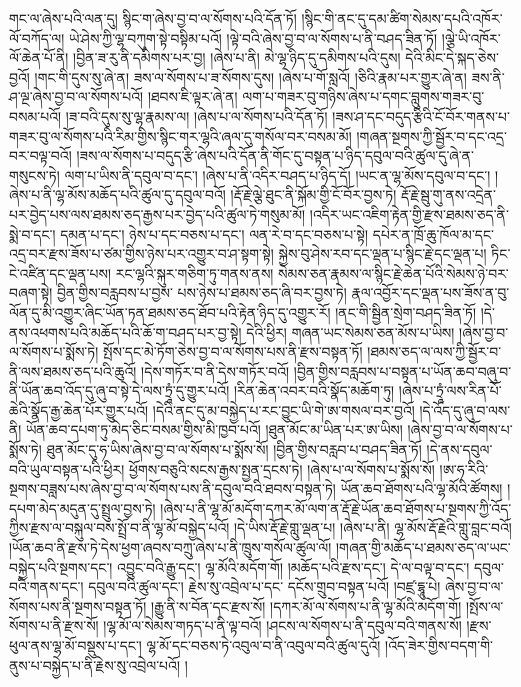 གང་ལ་ཞེས་པའི་ལན་དུ། སྙིང་ག་ཞེས་བྱ་བ་ལ་སོགས་པའི་དོན་ཏོ། །སྙིང་གི་ནང་དུ་དམ་ཚིག་སེམས་དཔའི་འཁོར་ལོ་བཀོད་ལ། ཡེ་ཤེས་ཀྱི་ལྷ་བཀུག་སྟེ་བསྟིམ་པའོ། །ལྟེ་བའི་ཞེས་བྱ་བ་ལ་སོགས་པ་ནི་བཤད་ཟིན་ཏོ། །ལྕེ་ཡི་འཁོར་ལོ་ཆེན་པོ་ནི། །བྱིན་ཟ་རུ་ནི་དམིགས་པར་བྱ། །ཞེས་པ་ནི། མེ་ལྷ་ཉིད་དུ་དམིགས་པའི་དུས། དེའི་མིང་དེ་སྐད་ཅེས་བྱའོ། །གང་གི་དུས་སུ་ཞེ་ན། ཟས་ལ་སོགས་པ་ཟ་སོགས་དུས། །ཞེས་པ་གོ་སླའོ། །ཅིའི་རྣམ་པར་གྱུར་ཞེ་ན། ཟས་ནི་ཤ་ལྔ་ཞེས་བྱ་བ་ལ་སོགས་པའོ། །ཐབས་ཇི་ལྟར་ཞེ་ན། ལག་པ་གཟར་བུ་གཉིས་ཞེས་པ་དགང་བླུགས་གཟར་བུ་བསམ་པའོ། །ཟ་བའི་དུས་སུ་ལྷ་རྣམས་ལ། །ཞེས་པ་ལ་སོགས་པའི་དོན་ཏོ། །ཟས་ཤ་དང་བདུད་རྩིའི་ངོ་བོར་གནས་པ་གཟར་བུ་ལ་སོགས་པའི་རིམ་གྱིས་སྙིང་གར་ལྷའི་ཞལ་དུ་གསོལ་བར་བསམ་མོ། །གཞན་སྔགས་ཀྱི་སྦྱོར་བ་དང་འདྲ་བར་བལྟ་བའོ། །ཟས་ལ་སོགས་པ་བདུད་རྩི་ཞེས་པའི་དོན་ནི་གོང་དུ་བསྟན་པ་ཉིད་དབུལ་བའི་ཚུལ་དུ་ཞེ་ན་གསུངས་ཏེ། ལག་པ་ཡིས་ནི་དབུལ་བ་དང་། །ཞེས་པ་ནི་འདིར་བཤད་པ་ཉིད་དོ། །ཡང་ན་ལྷ་མོས་དབུལ་བ་དང་། །ཞེས་པ་ནི་ལྷ་མོས་མཆོད་པའི་ཚུལ་དུ་དབུལ་བའོ། །རྡོ་རྗེ་ལྕེ་ཐུང་ནི་སྐོམ་གྱི་ངོ་བོར་བྱས་ཏེ། རྡོ་རྗེ་སྦུ་གུ་ནས་འདྲེན་པར་བྱེད་པས་ལས་ཐམས་ཅད་རྒྱས་པར་བྱེད་པའི་ཚུལ་ཏེ་གསུམ་མོ། །འདིར་ཡང་འཇིག་རྟེན་གྱི་རྫས་ཐམས་ཅད་ནི་སྨེ་བ་དང་། དམན་པ་དང་། ཉེས་པ་དང་བཅས་པ་དང་། ལན་རེ་བ་དང་བཅས་པ་སྟེ། དཔེར་ན་ཁྲོ་ཆུ་ཁོལ་མ་དང་འདྲ་བར་རྫས་ཟོས་པ་ཙམ་གྱིས་ཉེས་པར་འགྱུར་བ་ཤ་སྟག་སྟེ། སྐྱེས་བུ་ཤེས་རབ་དང་ལྡན་པ་སྙིང་རྗེ་དང་ལྡན་པ། ཏིང་ངེ་འཛིན་དང་ལྡན་པས། རང་ལྷའི་སྐུར་གཅིག་ཏུ་གནས་ནས། སེམས་ཅན་རྣམས་ལ་སྙིང་རྗེ་ཆེན་པོའི་སེམས་ཉེ་བར་བཞག་སྟེ། བྱིན་གྱིས་བརླབས་པ་བྱས་​ པས་ཉེས་པ་ཐམས་ཅད་ཞི་བར་བྱས་ཏེ། རྣལ་འབྱོར་དང་ལྡན་པས་ཟོས་ན་བུ་ལོན་དུ་མི་འགྱུར་ཞིང་ཡོན་ཏན་ཐམས་ཅད་ཐོབ་པའི་རྟེན་ཉིད་དུ་འགྱུར་རོ། །ནང་གི་སྦྱིན་སྲེག་བཤད་ཟིན་ཏོ། །དེ་ནས་འཕགས་པའི་མཆོད་པའི་ཆོ་ག་བཤད་པར་བྱ་སྟེ། དེའི་ཕྱིར། གཞན་ཡང་སེམས་ཅན་མོས་པ་ཡིས། །ཞེས་བྱ་བ་ལ་སོགས་པ་སྨོས་ཏེ། སྤོས་དང་མེ་ཏོག་ཅེས་བྱ་བ་ལ་སོགས་པས་ནི་རྫས་བསྟན་ཏོ། །ཐམས་ཅད་ལ་ལས་ཀྱི་སྦྱོར་བ་ནི་ལས་ཐམས་ཅད་པའི་ཆུའོ། །དེས་གཏོར་བ་ནི་དེས་གཏོར་བའོ། །བྱིན་གྱིས་བརླབས་པ་བསྟན་པ་ཡོན་ཆབ་བཞུ་བ་ནི་ཡོན་ཆབ་འོད་དུ་ཞུ་བ་སྟེ་དེ་ལས་ཏྲཱཾ་དུ་གྱུར་པའོ། །རིན་ཆེན་འབར་བའི་སྣོད་མཆོག་ཏུ། །ཞེས་པ་ཏྲཱཾ་ལས་རིན་པོ་ཆེའི་སྣོད་རྒྱ་ཆེན་པོར་གྱུར་པའོ། །དེའི་ནང་དུ་མ་བསྐྱེད་པ་རང་བྱུང་ཡི་གེ་ཨ་གསལ་བར་བྱའོ། །དེ་འོད་དུ་ཞུ་བ་ལས་ནི། ཡོན་ཆབ་དཔག་ཏུ་མེད་ཅིང་བསམ་གྱིས་མི་ཁྱབ་པའོ། །ཐུན་མོང་མ་ཡིན་པར་ཨ་ཡིས། །ཞེས་བྱ་བ་ལ་སོགས་པ་སྨོས་ཏེ། ཐུན་མོང་དུ་ཧ་ཡིས་ཞེས་བྱ་བ་ལ་སོགས་པ་སྨོས་སོ། །བྱིན་གྱིས་བརླབ་པ་བཤད་ཟིན་ཏོ། །དེ་ནས་དབུལ་བའི་ཡུལ་བསྟན་པའི་ཕྱིར། ཕྱོགས་བཅུའི་སངས་རྒྱས་སྤྱན་དྲངས་ཏེ། །ཞེས་པ་ལ་སོགས་པ་སྨོས་སོ། །ཨ་ཧ་རིའི་སྔགས་བཟླས་པས་ཞེས་བྱ་བ་ལ་སོགས་པས་ནི་དབུལ་བའི་ཐབས་བསྟན་ཏེ། ཡོན་ཆབ་ཐོགས་པའི་ལྷ་མོའི་ཚོགས། །དཔག་མེད་མདུན་དུ་སྤྲུལ་བྱས་ཏེ། །ཞེས་པ་ནི་ལྷ་མོ་མདོག་དཀར་མོ་ལག་ན་རྡོ་རྗེ་ཡོན་ཆབ་ཐོགས་པ་སྔགས་ཀྱི་འོད་ཀྱིས་རྫས་ལ་བསྐུལ་བས་སྤྲོ་བ་ནི་ལྷ་མོ་བསྐྱེད་པའོ། །དེ་ཡིས་རྡོ་རྗེ་གླུ་ལྡན་པ། །ཞེས་པ་ནི། ལྷ་མོས་རྡོ་རྗེའི་གླུ་བླང་བའོ། །ཡོན་ཆབ་ནི་རྫས་ཏེ་དེས་ཕྱག་ཞབས་བཀྲུ་ཞེས་པ་ནི་ཁྲུས་གསོལ་ཚུལ་ལོ། །གཞན་གྱི་མཆོད་པ་ཐམས་ཅད་ལ་ཡང་བསྐྱེད་པའི་སྔགས་དང་། འབྱུང་བའི་རྒྱུ་དང་། ལྷ་མོའི་མདོག་གོ། །མཆོད་པའི་རྫས་དང་། དེ་ལ་བལྟ་བ་དང་། དབུལ་བའི་གནས་དང་། དབུལ་བའི་ཚུལ་དང་། རྗེས་སུ་འབྲེལ་པ་དང་​ དངོས་གྲུབ་བསྟན་པའོ། །བཛྲ་དྷཱུ་པེ། ཞེས་བྱ་བ་ལ་སོགས་པས་ནི་སྔགས་བསྟན་ཏོ། །རྒྱུ་ནི་ས་བོན་དང་རྫས་སོ། །དཀར་མོ་ལ་སོགས་པ་ནི་ལྷ་མོའི་མདོག་གོ། །སྤོས་ལ་སོགས་པ་ནི་རྫས་སོ། །ལྷ་མོ་ལ་སེམས་གཏད་པ་ནི་ལྟ་བའོ། །ཤངས་ལ་སོགས་པ་ནི་དབུལ་བའི་གནས་སོ། །རྫས་ཕུལ་ནས་ལྷ་མོ་བསྡུས་པ་དང་། ལྷ་མོ་དང་བཅས་ཏེ་འབུལ་བ་ནི་འབུལ་བའི་ཚུལ་དུའོ། །འོད་ཟེར་གྱིས་བདག་གི་ནུས་པ་བསྐྱེད་པ་ནི་རྗེས་སུ་འབྲེལ་པའོ། །

